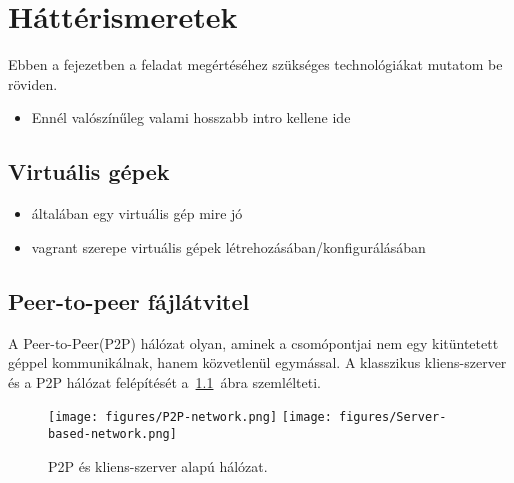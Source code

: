 \chapter{Háttérismeretek}
\label{chp:background}
Ebben a fejezetben a feladat megértéséhez szükséges technológiákat mutatom be röviden.
\begin{itemize}
	\item Ennél valószínűleg valami hosszabb intro kellene ide 
\end{itemize}

\section{Virtuális gépek}
\begin{itemize}
  \item általában egy virtuális gép mire jó
  \item	vagrant szerepe virtuális gépek létrehozásában/konfigurálásában
\end{itemize}

\section{Peer-to-peer fájlátvitel}
A Peer-to-Peer(P2P) hálózat olyan, aminek a csomópontjai nem egy kitüntetett géppel 
kommunikálnak, hanem közvetlenül egymással. A klasszikus kliens-szerver és a P2P hálózat felépítését
a~\ref{fig:networkcomparison}~ábra szemlélteti.

\begin{figure}[ht]
	\centering
	\texttt{[image: figures/P2P-network.png]}\hspace{1cm}
	\texttt{[image: figures/Server-based-network.png]}
	\caption{P2P és kliens-szerver alapú hálózat.}%
	\label{fig:networkcomparison}
\end{figure}

